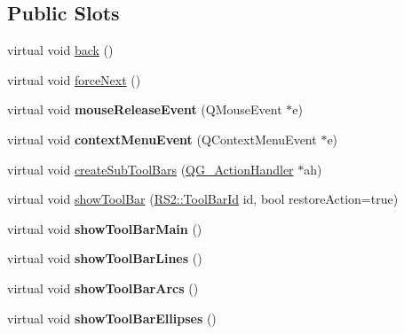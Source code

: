 \subsection*{Public Slots}
\begin{DoxyCompactItemize}
\item 
virtual void \hyperlink{classQG__CadToolBar_afa76804c68b489479cffc1ed687b5ee8}{back} ()
\item 
virtual void \hyperlink{classQG__CadToolBar_a80e2fa32a130058a1cc534e228d39555}{force\-Next} ()
\item 
\hypertarget{classQG__CadToolBar_a9d316577345fe5da898853b54b7f2ce9}{virtual void {\bfseries mouse\-Release\-Event} (Q\-Mouse\-Event $\ast$e)}\label{classQG__CadToolBar_a9d316577345fe5da898853b54b7f2ce9}

\item 
\hypertarget{classQG__CadToolBar_a23a52150c3881e60cc2ee4732534ca2f}{virtual void {\bfseries context\-Menu\-Event} (Q\-Context\-Menu\-Event $\ast$e)}\label{classQG__CadToolBar_a23a52150c3881e60cc2ee4732534ca2f}

\item 
virtual void \hyperlink{classQG__CadToolBar_a8135decc0f05cbd95e2a7e70aa474b5f}{create\-Sub\-Tool\-Bars} (\hyperlink{classQG__ActionHandler}{Q\-G\-\_\-\-Action\-Handler} $\ast$ah)
\item 
virtual void \hyperlink{classQG__CadToolBar_ad5da0c2a5641138907ba3aae4a02108b}{show\-Tool\-Bar} (\hyperlink{classRS2_a53db3c150d1d8d501b236d537de53793}{R\-S2\-::\-Tool\-Bar\-Id} id, bool restore\-Action=true)
\item 
\hypertarget{classQG__CadToolBar_a37c6e20fb69cda8efb49c1e716309d75}{virtual void {\bfseries show\-Tool\-Bar\-Main} ()}\label{classQG__CadToolBar_a37c6e20fb69cda8efb49c1e716309d75}

\item 
\hypertarget{classQG__CadToolBar_a9048328db606821ed5447309ff3e766a}{virtual void {\bfseries show\-Tool\-Bar\-Lines} ()}\label{classQG__CadToolBar_a9048328db606821ed5447309ff3e766a}

\item 
\hypertarget{classQG__CadToolBar_a0f26667e28838e6d11f1ac709caff2cd}{virtual void {\bfseries show\-Tool\-Bar\-Arcs} ()}\label{classQG__CadToolBar_a0f26667e28838e6d11f1ac709caff2cd}

\item 
\hypertarget{classQG__CadToolBar_ae5b88d73cfdbf9ec1e64e8cc3fed2306}{virtual void {\bfseries show\-Tool\-Bar\-Ellipses} ()}\label{classQG__CadToolBar_ae5b88d73cfdbf9ec1e64e8cc3fed2306}


\end{DoxyCompactItemize}
